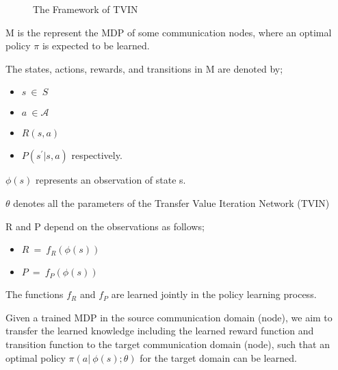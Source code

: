 \documentclass[letterpaper%
, twoside%
, 12pt%
,thesepararticles%
, english%
,creativecommons,hyperref, withAlgo2e%
]{thETS}
\begin{document}
\begin{figure}
\caption{The Framework of TVIN}
\end{figure}

M is the represent the MDP of some communication nodes, where an optimal policy $\displaystyle \pi $ is expected to be learned.

The states, actions, rewards, and transitions in M are denoted by;
\begin{itemize}
\item $\displaystyle s\ \in \mathcal{\ } S$
\item $\displaystyle a\ \in \mathcal{A}$
\item $\displaystyle R( s,a)$
\item $\displaystyle P\left( s^{'} |s,a\right)$ respectively.
\end{itemize}

$\displaystyle \phi ( s)$ represents an observation of state s.

$\displaystyle \theta $ denotes all the parameters of the Transfer Value Iteration Network (TVIN)

R and P depend on the observations as follows; 
\begin{itemize}
\item $\displaystyle R\ =\ f_{R}( \phi ( s))$
\item $\displaystyle P\ =\ f_{P}( \phi ( s))$
\end{itemize}

The functions $\displaystyle f_{R}$ and $\displaystyle f_{P}$ are learned jointly in the policy learning process.

Given a trained MDP in the source communication domain (node), we aim to transfer the learned knowledge including the learned reward function and transition function to the target communication domain (node), such that an optimal policy $\displaystyle \pi ( a|\ \phi ( s) ;\theta )$ for the target domain can be learned. 
\end{document}
